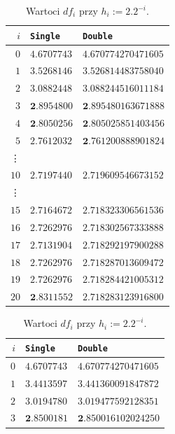 \documentclass[11pt,leqno]{article}
\begin{document}
\begin{table}[!h]
\renewcommand{\arraystretch}{1.1}
\begin{center}
\begin{minipage}{7cm}
\caption{Wartoci $df_i$ przy $h_i:=2^{-i}$.}\label{T:Tab1}
\vspace{1ex}
\begin{center}
\begin{tabular}{r|l|l}
$i$ & \texttt{Single} & \texttt{Double} \\ \hline
$0$ & $4.6707743$ & $4.670774270471605$ \\  
$1$ & $3.5268146$ & $3.526814483758040$ \\ 
$2$ & $3.0882448$ & $3.088244516011184$ \\ 
$3$ & $\bm{2}.8954800$ & $\bm{2}.895480163671888$ \\ 
$4$ & $\bm{2}.8050256$ & $\bm{2}.805025851403456$ \\ 
$5$ & $\bm{2.7}612032$ & $\bm{2}.761200888901824$ \\ 
\vdots &  & \\ 
$10$ & $\bm{2.71}97440$ & $\bm{2.71}9609546673152$ \\ 
 \vdots &  & \\
$15$ & $\bm{2.71}64672$ & $\bm{2.718}323306561536$ \\ 
$16$ & $\bm{2.7}262976$ & $\bm{2.718}302567333888$ \\ 
$17$ & $\bm{2.71}31904$ & $\bm{2.7182}92197900288$ \\ 
$18$ & $\bm{2.7}262976$ & $\bm{2.71828}7013609472$ \\ 
$19$ & $\bm{2.7}262976$ & $\bm{2.71828}4421005312$ \\ 
$20$ & $\bm{2}.8311552$ & $\bm{2.71828}3123916800$ 
\end{tabular}
\end{center}
\end{minipage}%
\begin{minipage}{8cm}
\caption{Wartoci $df_i$ przy $h_i:=2.2^{-i}$.}\label{T:Tab2}
\vspace{1ex}
\begin{center}
\begin{tabular}{r|l|l}
$i$ & \texttt{Single} & \texttt{Double} \\ \hline
$0$ & $4.6707743$ & $4.670774270471605$ \\ 
$1$ & $3.4413597$ & $3.441360091847872$ \\ 
$2$ & $3.0194780$ & $3.019477592128351$ \\ 
$3$ & $\bm{2}.8500181$ & $\bm{2}.850016102024250$ \\ 

\end{tabular}
\end{center}
\end{minipage}
\end{center}
\end{table}
\end{document}
